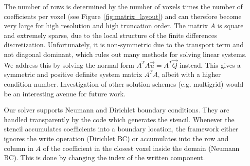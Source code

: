 The number of rows is determined by the number of voxels times the number of coefficients per voxel (see Figure~\ref{fig:matrix_layout}) and can therefore become very large for high resolution and high truncation order. The matrix $A$ is square and extremely sparse, due to the local structure of the finite differences discretization. Unfortunately, it is non-symmetric due to the transport term and not diagonal dominant, which rules out many  methods for solving linear systems.  We address this by solving the normal form $A^TA\vec{u}=A^T\vec{Q}$ instead. This gives a symmetric and positive definite system matrix $A^TA$, albeit with a higher condition number. Investigation of other solution schemes (e.g. multigrid) would be an interesting avenue for future work. 

Our solver supports Neumann and Dirichlet boundary conditions. They are handled transparently by the code which generates the stencil. Whenever the stencil accumulates coefficients into a boundary location, the framework either ignores the write operation (Dirichlet BC) or accumulates into the row and column in $A$ of the coefficient in the closest voxel inside the domain (Neumann BC). This is done by changing the index of the written component.








